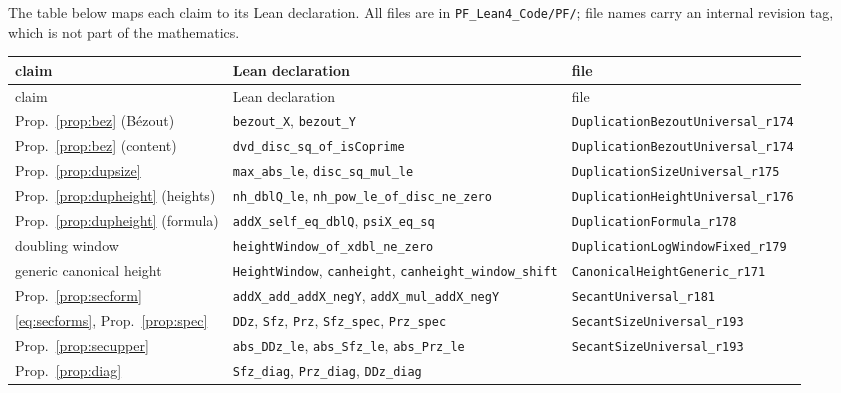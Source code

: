 \documentclass[11pt,reqno]{amsart}
\theoremstyle{plain}
\theoremstyle{definition}
\theoremstyle{remark}
\DeclareRobustCommand{\lt}[1]{\texttt{#1}}
\begin{document}
The table below maps each claim to its Lean declaration. All files are
in \lt{PF\_Lean4\_Code/PF/}; file names carry an internal revision tag,
which is not part of the mathematics.

\begingroup
\footnotesize
\setlength{\LTleft}{0pt}\setlength{\LTright}{0pt}
\setlength{\tabcolsep}{4pt}
\begin{longtable}{@{}p{}p{}p{}@{}}
\toprule
claim & Lean declaration & file \\
\midrule
\endfirsthead
\toprule
claim & Lean declaration & file \\
\midrule
\endhead
\bottomrule
\endfoot
Prop.~\ref{prop:bez} (B\'ezout)
  & \lt{bezout\_X}, \lt{bezout\_Y}
  & \lt{DuplicationBezoutUniversal\_r174}\\
Prop.~\ref{prop:bez} (content)
  & \lt{dvd\_disc\_sq\_of\_isCoprime}
  & \lt{DuplicationBezoutUniversal\_r174}\\
Prop.~\ref{prop:dupsize}
  & \lt{max\_abs\_le}, \lt{disc\_sq\_mul\_le}
  & \lt{DuplicationSizeUniversal\_r175}\\
Prop.~\ref{prop:dupheight} (heights)
  & \lt{nh\_dblQ\_le},\newline
    \lt{nh\_pow\_le\_of\_disc\_ne\_zero}
  & \lt{DuplicationHeightUniversal\_r176}\\
Prop.~\ref{prop:dupheight} (formula)
  & \lt{addX\_self\_eq\_dblQ}, \lt{psiX\_eq\_sq}
  & \lt{DuplicationFormula\_r178}\\
doubling window
  & \lt{heightWindow\_of\_xdbl\_ne\_zero}
  & \lt{DuplicationLogWindowFixed\_r179}\\
generic canonical height
  & \lt{HeightWindow}, \lt{canheight},\newline
    \lt{canheight\_window\_shift}
  & \lt{CanonicalHeightGeneric\_r171}\\
Prop.~\ref{prop:secform}
  & \lt{addX\_add\_addX\_negY},\newline
    \lt{addX\_mul\_addX\_negY}
  & \lt{SecantUniversal\_r181}\\
\eqref{eq:secforms}, Prop.~\ref{prop:spec}
  & \lt{DDz}, \lt{Sfz}, \lt{Prz},\newline
    \lt{Sfz\_spec}, \lt{Prz\_spec}
  & \lt{SecantSizeUniversal\_r193}\\
Prop.~\ref{prop:secupper}
  & \lt{abs\_DDz\_le}, \lt{abs\_Sfz\_le},\newline
    \lt{abs\_Prz\_le}
  & \lt{SecantSizeUniversal\_r193}\\
Prop.~\ref{prop:diag}
  & \lt{Sfz\_diag}, \lt{Prz\_diag}, \lt{DDz\_diag}

\end{longtable}
\end{document}
